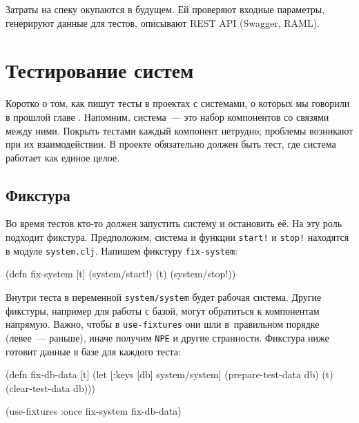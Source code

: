
Затраты на спеку окупаются в будущем. Ей проверяют входные параметры, генерируют
данные для тестов, описывают REST API (Swagger, RAML).

\section{Тестирование систем}


Коротко о том, как пишут тесты в проектах с системами, о которых мы говорили в
прошлой главе . Напомним, система~--- это набор компонентов со
связями между ними. Покрыть тестами каждый компонент нетрудно; проблемы
возникают при их взаимодействии. В проекте обязательно должен быть тест, где
система работает как единое целое.

\subsection{Фикстура}


Во время тестов кто-то должен запустить систему и остановить её. На эту роль
подходит фикстура. Предположим, система и функции \verb|start!| и \verb|stop!|
находятся в модуле \verb|system.clj|. Напишем фикстуру \verb|fix-system|:

\begin{english}
  \begin{clojure}
(defn fix-system
  [t]
  (system/start!)
  (t)
  (system/stop!))
  \end{clojure}
\end{english}

Внутри теста в переменной \verb|system/system| будет рабочая система. Другие
фикстуры, например для работы с базой, могут обратиться к компонентам
напрямую. Важно, чтобы в \verb|use-fixtures| они шли в~правильном порядке
(левее~--- раньше), иначе получим \verb|NPE| и другие странности. Фикстура ниже
готовит данные в базе для каждого теста:


\ifx\DEVICETYPE\MOBILE

\begin{english}
  \begin{clojure}
(defn fix-db-data
  [t]
  (let [{:keys [db]} system/system]
    (prepare-test-data db)
    (t)
    (clear-test-data db)))

(use-fixtures :once
  fix-system fix-db-data)
  \end{clojure}
\end{english}

